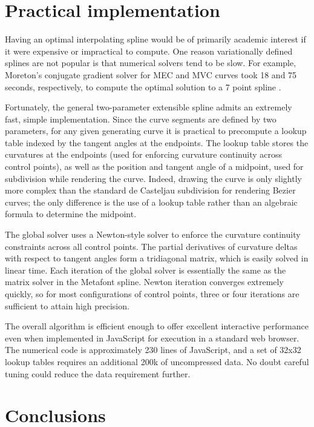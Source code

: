 \documentclass{article}
\begin{document}
\section{Practical implementation}

Having an optimal interpolating spline would be of primarily academic
interest if it were expensive or impractical to compute. One reason
variationally defined splines are not popular is that numerical
solvers tend to be slow. For example, Moreton's
conjugate gradient solver for MEC and MVC curves took 18 and 75
seconds, respectively, to
compute the optimal solution to a 7 point spline \cite[p. 99]{Moreton92}.

Fortunately, the general two-parameter extensible spline admits an
extremely fast, simple implementation. Since the curve segments
are defined by two parameters, for any given generating curve it is
practical to precompute a lookup table indexed by the tangent angles
at the endpoints. The lookup table stores the curvatures at the
endpoints (used for enforcing curvature continuity across control
points), as well as the position and tangent angle of a midpoint, used
for subdivision while rendering the curve. Indeed, drawing the curve
is only slightly more complex than the standard de Casteljau
subdivision for rendering Bezier curves; the only difference is the
use of a lookup table rather than an algebraic formula to determine
the midpoint.

The global solver uses a Newton-style solver to enforce the curvature
continuity constraints across all control points. The partial
derivatives of curvature deltas with respect to tangent angles form a
tridiagonal matrix, which is easily solved in linear time. 
Each iteration of the global solver is essentially the same as the
matrix solver in the Metafont spline. Newton iteration converges
extremely quickly, so for most configurations of control points, three
or four iterations are sufficient to attain high precision.

The overall algorithm is efficient enough to offer excellent
interactive performance even when implemented in JavaScript for
execution in a standard web browser. The numerical code is
approximately 230 lines of JavaScript, and a set of 32x32 lookup
tables requires an additional 200k of uncompressed data. No doubt
careful tuning could reduce the data requirement further.

\section{Conclusions}
\end{document}
